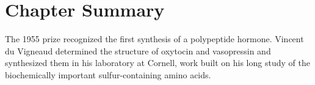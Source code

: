 \clearpage

\section*{Chapter Summary}

The 1955 prize recognized the first synthesis of a polypeptide hormone. Vincent du Vigneaud determined the structure of oxytocin and vasopressin and synthesized them in his laboratory at Cornell, work built on his long study of the biochemically important sulfur-containing amino acids.

